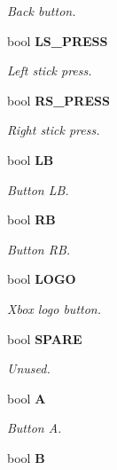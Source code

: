 \begin{DoxyCompactItemize}
\begin{DoxyCompactList}\small\item\em Back button. \end{DoxyCompactList}\item 
bool {\bf L\-S\-\_\-\-P\-R\-E\-S\-S}\label{struct_buttons_a5e73bda0e232c16c3ccf8d4f64c28112}

\begin{DoxyCompactList}\small\item\em Left stick press. \end{DoxyCompactList}\item 
bool {\bf R\-S\-\_\-\-P\-R\-E\-S\-S}\label{struct_buttons_a060553e2ecadce74e0f2a06990caeb9f}

\begin{DoxyCompactList}\small\item\em Right stick press. \end{DoxyCompactList}\item 
bool {\bf L\-B}\label{struct_buttons_ada81b06ca9633d27de104929011da3ec}

\begin{DoxyCompactList}\small\item\em Button L\-B. \end{DoxyCompactList}\item 
bool {\bf R\-B}\label{struct_buttons_a6d7bc7609cc3e233e0044813780ab2d4}

\begin{DoxyCompactList}\small\item\em Button R\-B. \end{DoxyCompactList}\item 
bool {\bf L\-O\-G\-O}\label{struct_buttons_a756d4aa3f95373a5058cb02a897d12cf}

\begin{DoxyCompactList}\small\item\em Xbox logo button. \end{DoxyCompactList}\item 
bool {\bf S\-P\-A\-R\-E}\label{struct_buttons_aaf3a9df2c4578bd2d3591334e0d9ace5}

\begin{DoxyCompactList}\small\item\em Unused. \end{DoxyCompactList}\item 
bool {\bf A}\label{struct_buttons_a014568bcfa1204a9c4ca9799c1b47102}

\begin{DoxyCompactList}\small\item\em Button A. \end{DoxyCompactList}\item 
bool {\bf B}\label{struct_buttons_a0152c46354bddcc592bce01be84d9dfd}


\end{DoxyCompactItemize}

